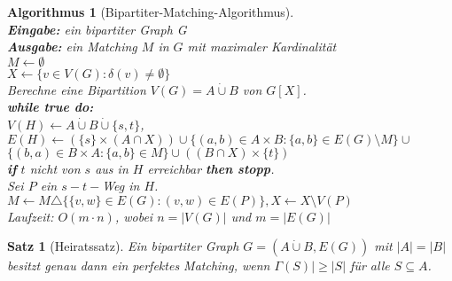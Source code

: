 \documentclass[12pt,a4paper]{article}
\theoremstyle{plain}
\newtheorem{Satz}[Theorem]{Satz}
\newtheorem{Algorithmus}[Theorem]{Algorithmus}
\newcommand{\cupdot}{\mathbin{\dot{\cup}}}
\numberwithin{equation}{section}
\begin{document}
\begin{Algorithmus}[Bipartiter-Matching-Algorithmus]\\
\textbf{Eingabe:} ein bipartiter Graph G\\
\textbf{Ausgabe:} ein Matching $M$ in $G$ mit maximaler Kardinalität\\
$M\leftarrow \emptyset$\\
$X\leftarrow \{v\in V(G):\delta(v)\neq \emptyset\}$\\
Berechne eine Bipartition $V(G)=A\cupdot B$ von $G[X]$.\\
\textbf{while true do:}\\
\text{\qquad} $V(H) \leftarrow A\cupdot B\cupdot\{s,t\}$,\\
\text{\qquad} $E(H)\leftarrow \left( \{s\}\times (A \cap X)\right) \cup \{(a,b)\in A\times B:\{a,b\}\in E(G)\setminus M\} \cup$ \\ \text{\qquad\qquad\qquad} $ \{(b,a)\in B\times A: \{a,b\}\in M\} \cup \left( (B\cap X) \times \{t\}\right)$ \\
\text{\qquad} \textbf{if} $t$ nicht von $s$ aus in $H$ erreichbar \textbf{then stopp}.\\
\text{\qquad} Sei $P$ ein $s-t-$Weg in $H$.\\
\text{\qquad} $M\leftarrow M \triangle \{\{v,w\} \in E(G):(v,w)\in E(P)\}, X \leftarrow X \setminus V(P)$\\
Laufzeit: $O(m\cdot n)$, wobei $n=|V(G)|$ und $m=|E(G)|$
\end{Algorithmus}
\begin{Satz}[Heiratssatz]
Ein bipartiter Graph $G=(A\cupdot B, E(G))$ mit $|A|=|B|$ besitzt genau dann ein perfektes Matching, wenn $\Gamma(S)|\geq |S|$ für alle $S\subseteq A$.
\end{Satz}
\end{document}
